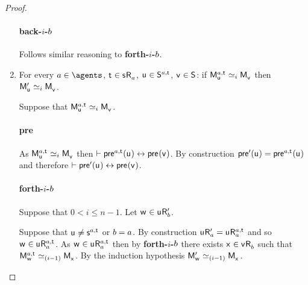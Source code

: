 \begin{proof}
\begin{enumerate}
        \paragraph{back-$i$-$b$} Follows similar reasoning to {\bf forth-$i$-$b$}.

    \item 
        For every $\agentA \in \agents$, $\aStateT \in \aStateS \aAccessibility{\agentA}$, $\aStateU \in \aStates[\agentA,\aStateT]$, $\aStateV \in \aStates$: if $\aPModel[\agentA,\aStateT]{\aStateU} \bisimilar[i] \aPModel{\aStateV}$ then $\aPModelP{\aStateU} \bisimilar[i] \aPModel{\aStateV}$.

        Suppose that $\aPModel[\agentA,\aStateT]{\aStateU} \bisimilar[i] \aPModel{\aStateV}$. 

        \paragraph{pre}

        As $\aPModel[\agentA,\aStateT]{\aStateU} \bisimilar[i] \aPModel{\aStateV}$ then $\proves \aPrecondition[\agentA,\aStateT](\aStateU) \iff \aPrecondition(\aStateV)$. 
        By construction $\aPreconditionP(\aStateU) = \aPrecondition[\agentA,\aStateT](\aStateU)$ and therefore $\proves \aPreconditionP(\aStateU) \iff \aPrecondition(\aStateV)$.

        \paragraph{forth-$i$-$b$}

        Suppose that $0 < i \leq n - 1$.
        Let $\aStateW \in \aStateU \aAccessibilityP{\agentB}$.

        Suppose that $\aStateU \neq \aStateS[\agentA,\aStateT]$ or $b = a$.
        By construction $\aStateU \aAccessibilityP{\agentA} = \aStateU \aAccessibility[\agentA,\aStateT]{\agentA}$ and so $\aStateW \in \aStateU \aAccessibility[\agentA,\aStateT]{\agentA}$. 
        As $\aStateW \in \aStateU \aAccessibility[\agentA,\aStateT]{\agentA}$ then by {\bf forth-$i$-$b$} there exists $\aStateX \in \aStateV \aAccessibility{\agentB}$ such that $\aPModel[\agentA,\aStateT]{\aStateW} \bisimilar[(i - 1)] \aPModel{\aStateX}$.
        By the induction hypothesis $\aPModelP{\aStateW} \bisimilar[(i - 1)] \aPModel{\aStateX}$.


\end{enumerate}
\end{proof}
